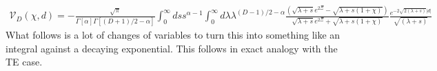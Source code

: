 \begin{align}
\mathcal{V}_D(\chi,d)=-\frac{\sqrt{\pi}}{\Gamma[\alpha]\Gamma\left[(D+1)/2-\alpha\right]}
\int_0^\infty ds s^{\alpha-1}\int_0^\infty d\lambda \lambda^{(D-1)/2-\alpha}
\frac{\left(\sqrt{\lambda+s}e^{2\Xi }- \sqrt{\lambda +s(1 +\chi)}\right) }
{\sqrt{\lambda +s} e^{2 \Xi }+\sqrt{\lambda +s(1+\chi)}}\frac{e^{-2\sqrt{2(\lambda+s) } |d|}}{\sqrt{(\lambda+s)}}
\end{align}
What follows is a lot of changes of variables to turn this into something like an integral against a decaying exponential.  
This follows in exact analogy with the TE case.  
